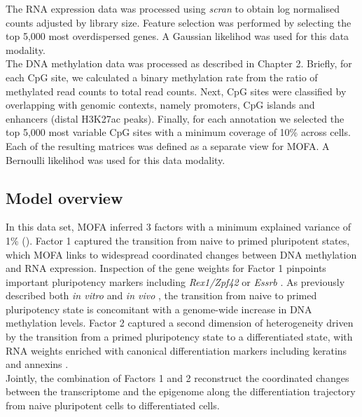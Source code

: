 The RNA expression data was processed using \textit{scran}\cite{Lun2016b} to obtain log normalised counts adjusted by library size. Feature selection was performed by selecting the top 5,000 most overdispersed genes\cite{Lun2016a}. A Gaussian likelihod was used for this data modality. \\
The DNA methylation data was processed as described in Chapter 2. Briefly, for each CpG site, we calculated a binary methylation rate from the ratio of methylated read counts to total read counts. Next, CpG sites were classified by overlapping with genomic contexts, namely promoters, CpG islands and enhancers (distal H3K27ac peaks). Finally, for each annotation we selected the top 5,000 most variable CpG sites with a minimum coverage of 10\% across cells. Each of the resulting matrices was defined as a separate view for MOFA. A Bernoulli likelihod was used for this data modality.


\subsection{Model overview}

In this data set, MOFA inferred 3 factors with a minimum explained variance of 1\% (). Factor 1 captured the transition from naive to primed pluripotent states, which MOFA links to widespread coordinated changes between DNA methylation and RNA expression. Inspection of the gene weights for Factor 1 pinpoints important pluripotency markers including  \textit{Rex1/Zpf42} or \textit{Essrb} \cite{Mohammed2017}. As previously described both \textit{in vitro} \cite{Angermueller2016} and \textit{in vivo} \cite{Auclair2014}, the transition from naive to primed pluripotency state is concomitant with a genome-wide increase in DNA methylation levels. Factor 2 captured a second dimension of heterogeneity driven by the transition from a primed pluripotency state to a differentiated state, with RNA weights enriched with canonical differentiation markers including keratins and annexins \cite{Fuchs1988}.\\
Jointly, the combination of Factors 1 and 2 reconstruct the coordinated changes between the transcriptome and the epigenome along the differentiation trajectory from naive pluripotent cells to differentiated cells.

